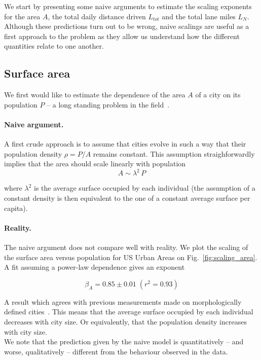 We start by presenting some naive arguments to estimate the scaling exponents
for the area $A$, the total daily distance driven $L_{tot}$ and the total lane
miles $L_N$. Although these predictions turn out to be wrong, naive scalings are
useful as a first approach to the problem as they allow us understand how the
different quantities relate to one another.

\subsection{Surface area}

We first would like to estimate the dependence of the area
$A$ of a city on its population $P$ -- a long standing problem in the
field~\cite{Stewart:1947, Batty:2011}.

\paragraph{Naive argument.}  A first crude approach is to assume
that cities evolve in such a way that their population density $\rho = P/A$
remains constant. This assumption straighforwardly implies that the area should
scale linearly with population
%
\begin{equation} 
    A \sim \lambda^2\, P 
    \label{eq:area_naive} 
\end{equation}

where $\lambda^2$ is the average surface occupied by each individual (the
assumption of a constant density is then equivalent to the one of a constant
average surface per capita).

\paragraph{Reality.} The naive argument does not compare well with reality. We
plot the scaling of the surface area versus population for US Urban Areas on
Fig.~\ref{fig:scaling_area}. A fit assuming a power-law dependence gives an exponent

\begin{equation}
    \boxed{\beta_A = 0.85 \pm 0.01\;(r^2 = 0.93)}
\end{equation}

A result which agrees with previous measurements made on morphologically defined
cities~\cite{Batty:2011}. This means that the average surface occupied by each individual decreases with
city size. Or equivalently, that the population density increases with city size.\\
We note that the prediction given by the naive model is quantitatively -- and
worse, qualitatively -- different from the behaviour observed in the data.

